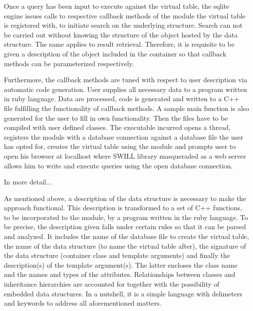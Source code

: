 \documentclass[pdftex, 11pt, a4paper]{report}
\begin{document}
\par
Once a query has been input to execute against the virtual table, the sqlite engine issues calls to respective callback methods of the module the virtual table is registered with, to initiate search on the underlying structure. Search can not be carried out without knowing the structure of the object hosted by the data structure. The same applies to result retrieval. Therefore, it is requisite to be given a description of the object included in the container so that callback methods can be parameterized respectively. 
\par
Furthermore, the callback methods are tuned with respect to user description via automatic code generation. User supplies all necessary data to a program written in ruby language. Data are processed, code is generated and written to a C++ file fulfilling the functionality of callback methods. A sample main function is also generated for the user to fill in own functionality. Then the files have to be compiled with user defined classes. The executable incurred opens a thread, registers the module with a database connection against a database file the user has opted for, creates the virtual table using the module and prompts user to open his browser at localhost where SWILL library masqueraded as a web server allows him to write and execute queries using the open database connection.
\par
In more detail...
\par
As mentioned above, a description of the data structure is necessary to make the approach functional. This description is transformed to a set of C++ functions, to be incorporated to the module, by a program written in the ruby language. To be precise, the description given falls under certain rules so that it can be parsed and analyzed. It includes the name of the database file to create the virtual table, the name of the data structure (to name the virtual table after), the signature of the data structure (container class and template arguments) and finally the description(s) of the template argument(s). The latter encloses the class name and the names and types of the attributes. Relationships between classes and inheritance hierarchies are accounted for together with the possibility of embedded data structures. In a nutshell, it is a simple language with delimeters and keywords to address all aforementioned matters.
\par
\end{document}
